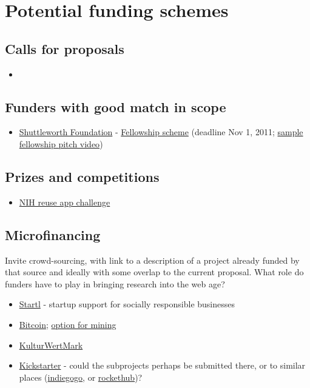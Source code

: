 \documentclass[final,authoryear,3p]{elsarticle-open-drafting}
\begin{document}
\section{Potential funding schemes}
\subsection{Calls for proposals}
\begin{itemize}
	\item 
\end{itemize}
\subsection{Funders with good match in scope}
\begin{itemize}
	\item \href{http://www.shuttleworthfoundation.org/}{Shuttleworth Foundation} - \href{http://www.shuttleworthfoundation.org/funding/fellowship-programme/}{Fellowship scheme} (deadline Nov 1, 2011; \href{http://vimeo.com/10401282}{sample fellowship pitch video})
\end{itemize}
\subsection{Prizes and competitions}
\begin{itemize}
	\item \href{http://challenge.gov/NIH/132-nlm-show-off-your-apps-innovative-uses-of-nlm-information}{NIH reuse app challenge}
\end{itemize}

\subsection{Microfinancing}
Invite crowd-sourcing, with link to a description of a project already funded by that source and ideally with some overlap to the current proposal. What role do funders have to play in bringing research into the web age?
\begin{itemize}
	\item \href{http://startl.org/}{Startl} - startup support for socially responsible businesses
	\item \href{https://en.bitcoin.it/wiki/Introduction#Preventing_double-spending}{Bitcoin}; \href{http://www.bitcoinplus.com}{option for mining}
	\item \href{http://www.ccc.de/en/updates/2011/kulturwertmark}{KulturWertMark}
	\item \href{http://blog.kickstarter.com/post/5014573685/happy-birthday-kickstarter}{Kickstarter} - could the subprojects perhaps be submitted there, or to similar places (\href{http://www.indiegogo.com/}{indiegogo}, or \href{http://www.rockethub.com/}{rockethub})?

\end{itemize}
\end{document}

